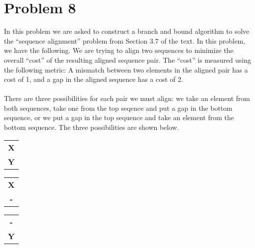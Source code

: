 \section*{Problem 8}

In this problem we are asked to construct a branch and bound algorithm to solve the ``sequence alignment'' problem from Section 3.7 of the text. In this problem, we have the following. We are trying to align two sequences to minimize the overall ``cost'' of the resulting aligned sequence pair. The ``cost'' is measured using the following metric: A mismatch between two elements in the aligned pair has a cost of 1, and a gap in the aligned sequence has a cost of 2.
\\
\\
There are three possibilities for each pair we must align: we take an element from both sequences, take one from the top seqence and put a gap in the bottom sequence, or we put a gap in the top sequence and take an element from the bottom sequence. The three possibilities are shown below.

\begin{center}
	\begin{minipage}{0.3\textwidth}
	\centering
	\begin{tabular}{c}	
		{\large \textbf{X}} \\
		{\large \textbf{Y}} \\
	\end{tabular}
	\end{minipage}
	\begin{minipage}{0.3\textwidth}
		\centering
	\begin{tabular}{c}
		{\large \textbf{X}} \\
		{\large \textbf{-}} \\
	\end{tabular}
	\end{minipage}
	\begin{minipage}{0.3\textwidth}
		\centering
	\begin{tabular}{c}
		{\large \textbf{-}} \\
		{\large \textbf{Y}} \\
	\end{tabular}
	\end{minipage}
\end{center}

